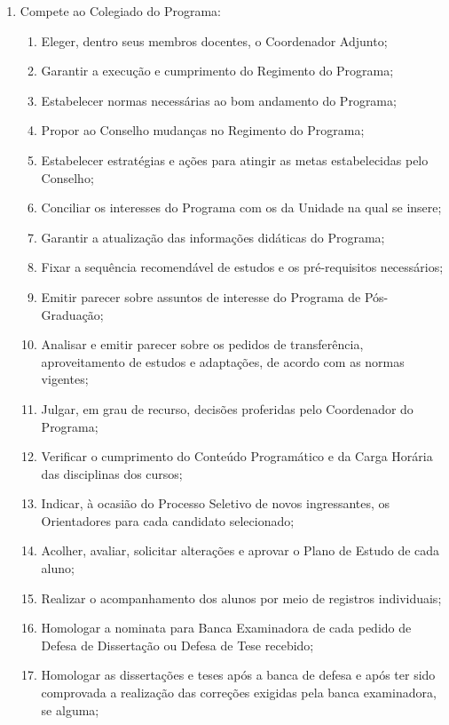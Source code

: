 \documentclass{article}
\newcommand{\grupoMenor}{Colegiado\xspace}
\newcommand{\grupoMaior}{Conselho\xspace}
\begin{document}
\begin{enumerate}
	\item Compete ao \grupoMenor do Programa:
	\begin{enumerate}[label=\Roman*]
		\item Eleger, dentro seus membros docentes, o Coordenador Adjunto;	%
		\item Garantir a execução e cumprimento do Regimento do Programa;
		\item Estabelecer normas necessárias ao bom andamento do Programa;
		\item Propor ao \grupoMaior mudanças no Regimento do Programa;
		\item Estabelecer estratégias e ações para atingir as metas estabelecidas pelo \grupoMaior;
		\item Conciliar os interesses do Programa com os da Unidade na qual se insere;
		\item Garantir a atualização das informações didáticas do Programa;
		\item Fixar a sequência recomendável de estudos e os pré-requisitos necessários;
		\item Emitir parecer sobre assuntos de interesse do Programa de Pós-Graduação;
		\item Analisar e emitir parecer sobre os pedidos de transferência, aproveitamento de estudos e adaptações, de acordo com as normas vigentes;
		\item Julgar, em grau de recurso, decisões proferidas pelo Coordenador do Programa;
		\item Verificar o cumprimento do Conteúdo Programático e da Carga Horária das disciplinas dos cursos;
		\item Indicar, à ocasião do Processo Seletivo de novos ingressantes, os Orientadores para cada candidato selecionado;	
		\item Acolher, avaliar, solicitar alterações e aprovar o Plano de Estudo de cada aluno;
		\item Realizar o acompanhamento dos alunos por meio de registros individuais;
		\item Homologar a nominata para Banca Examinadora de cada pedido de Defesa de Dissertação ou Defesa de Tese recebido;
		\item Homologar as dissertações e teses após a banca de defesa e após ter sido comprovada a realização das correções exigidas pela banca examinadora, se alguma;

\end{enumerate}
\end{enumerate}
\end{document}
